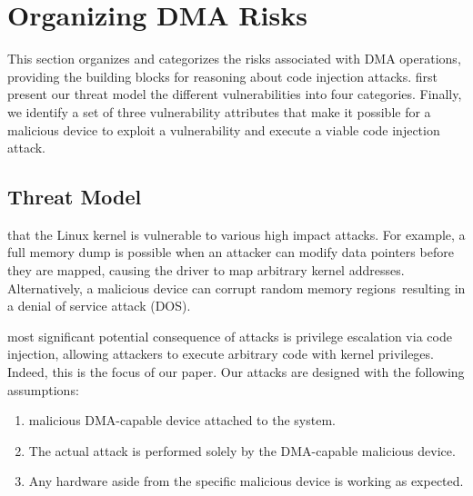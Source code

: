 
\section{Organizing DMA Risks}\label{sec:dma-risks}
This section organizes and categorizes the risks associated with DMA operations, providing the building blocks for reasoning about code injection attacks.
\DIFdelbegin {}\DIFdelend \DIFaddbegin {}\DIFaddend first present our threat model \DIFdelbegin {}\DIFdelend \DIFaddbegin {}\DIFaddend the different \subpage{} vulnerabilities into four categories.
Finally, we identify a set of three vulnerability attributes that make it possible for a malicious device to exploit a \subpage{} vulnerability and execute a viable code injection attack.

\subsection{Threat Model}\label{sec:threat_model}
\DIFdelbegin {}\DIFdelend \DIFaddbegin {}\DIFaddend that the Linux kernel is vulnerable to various high impact attacks.
For example, a full memory dump is possible when an attacker can modify data pointers before they are mapped, causing the driver to map arbitrary kernel addresses.
Alternatively, a malicious device can corrupt random memory regions~\cite{MMT16}\DIFaddbegin \DIFadd{, }\DIFaddend resulting in a denial of service attack (DOS).


\DIFdelbegin {}\DIFdelend \DIFaddbegin {}\DIFaddend most significant potential consequence of \DIFdelbegin {}\DIFdelend \DIFaddbegin {}\DIFaddend attacks is privilege escalation via code injection, allowing attackers to execute arbitrary code with kernel privileges. Indeed, this is the focus of our paper. 
Our attacks are designed with the following assumptions:
\begin{enumerate}
    \item \DIFdelbegin {}\DIFdelend \DIFaddbegin {}\DIFaddend malicious DMA-capable device \DIFaddbegin {}\DIFaddend attached to the system.
    \item The actual attack is performed solely by the DMA-capable malicious device.
    \item Any hardware aside from the specific malicious device is working as expected.
 \end{enumerate}


